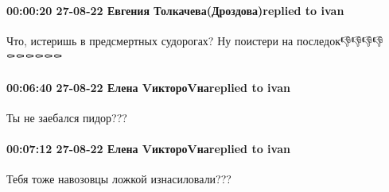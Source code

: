  
 
 
 
 

\paragraph{00:00:20 27-08-22 Евгения Толкачева(Дроздова)replied to ivan}

Что, истеришь в предсмертных судорогах? Ну поистери на последок👎👎👎👎⚰️⚰️⚰️⚰️⚰️⚰️

\paragraph{00:06:40 27-08-22 Елена VиктороVнаreplied to ivan}
Ты не заебался пидор???

\paragraph{00:07:12 27-08-22 Елена VиктороVнаreplied to ivan}
Тебя тоже навозовцы ложкой изнасиловали???
